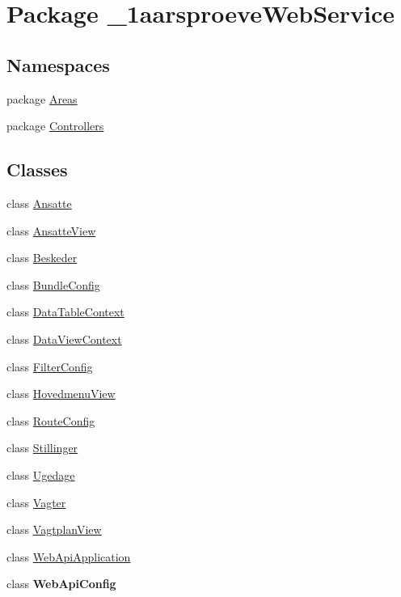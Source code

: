 \hypertarget{namespace__1aarsproeve_web_service}{}\section{Package \+\_\+1aarsproeve\+Web\+Service}
\label{namespace__1aarsproeve_web_service}
\subsection*{Namespaces}
\begin{DoxyCompactItemize}
\item 
package \hyperlink{namespace__1aarsproeve_web_service_1_1_areas}{Areas}
\item 
package \hyperlink{namespace__1aarsproeve_web_service_1_1_controllers}{Controllers}
\end{DoxyCompactItemize}
\subsection*{Classes}
\begin{DoxyCompactItemize}
\item 
class \hyperlink{class__1aarsproeve_web_service_1_1_ansatte}{Ansatte}
\item 
class \hyperlink{class__1aarsproeve_web_service_1_1_ansatte_view}{Ansatte\+View}
\item 
class \hyperlink{class__1aarsproeve_web_service_1_1_beskeder}{Beskeder}
\item 
class \hyperlink{class__1aarsproeve_web_service_1_1_bundle_config}{Bundle\+Config}
\item 
class \hyperlink{class__1aarsproeve_web_service_1_1_data_table_context}{Data\+Table\+Context}
\item 
class \hyperlink{class__1aarsproeve_web_service_1_1_data_view_context}{Data\+View\+Context}
\item 
class \hyperlink{class__1aarsproeve_web_service_1_1_filter_config}{Filter\+Config}
\item 
class \hyperlink{class__1aarsproeve_web_service_1_1_hovedmenu_view}{Hovedmenu\+View}
\item 
class \hyperlink{class__1aarsproeve_web_service_1_1_route_config}{Route\+Config}
\item 
class \hyperlink{class__1aarsproeve_web_service_1_1_stillinger}{Stillinger}
\item 
class \hyperlink{class__1aarsproeve_web_service_1_1_ugedage}{Ugedage}
\item 
class \hyperlink{class__1aarsproeve_web_service_1_1_vagter}{Vagter}
\item 
class \hyperlink{class__1aarsproeve_web_service_1_1_vagtplan_view}{Vagtplan\+View}
\item 
class \hyperlink{class__1aarsproeve_web_service_1_1_web_api_application}{Web\+Api\+Application}
\item 
class {\bfseries Web\+Api\+Config}
\end{DoxyCompactItemize}
